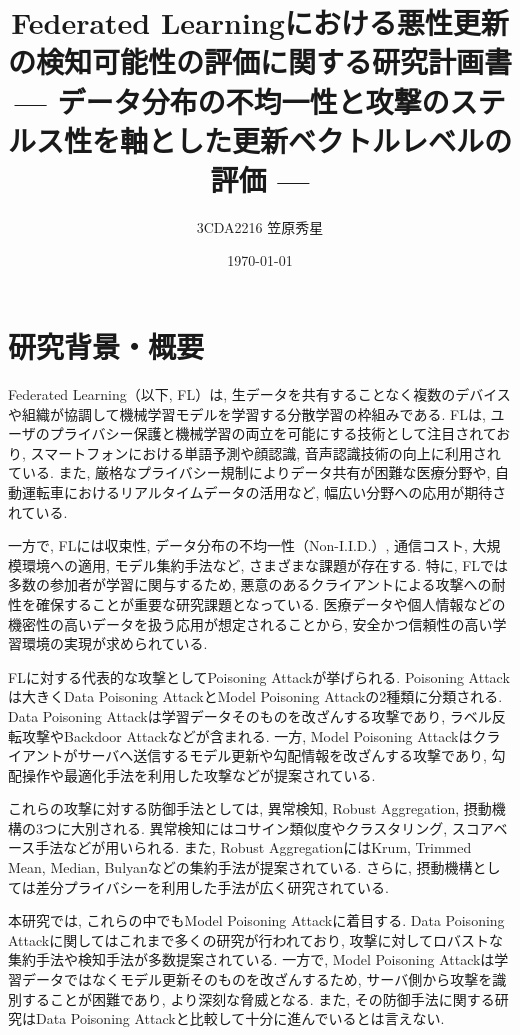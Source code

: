 \documentclass[a4j, twocolumn, dvipdfmx]{jsarticle}
\title{
Federated Learningにおける悪性更新の検知可能性の評価に関する研究計画書\\
\large --- データ分布の不均一性と攻撃のステルス性を軸とした更新ベクトルレベルの評価 ---
}
\author{3CDA2216 笠原秀星}
\date{\today}
\begin{document}
\maketitle

\section{研究背景・概要}

Federated Learning（以下, FL）は, 生データを共有することなく複数のデバイスや組織が協調して機械学習モデルを学習する分散学習の枠組みである\cite{mammen2021fl}.
FLは, ユーザのプライバシー保護と機械学習の両立を可能にする技術として注目されており, スマートフォンにおける単語予測や顔認識, 音声認識技術の向上に利用されている. また, 厳格なプライバシー規制によりデータ共有が困難な医療分野や, 自動運転車におけるリアルタイムデータの活用など, 幅広い分野への応用が期待されている\cite{li2019fl}.

一方で, FLには収束性, データ分布の不均一性（Non-I.I.D.）, 通信コスト, 大規模環境への適用, モデル集約手法など, さまざまな課題が存在する\cite{ma2020privacy}. 特に, FLでは多数の参加者が学習に関与するため, 悪意のあるクライアントによる攻撃への耐性を確保することが重要な研究課題となっている. 医療データや個人情報などの機密性の高いデータを扱う応用が想定されることから, 安全かつ信頼性の高い学習環境の実現が求められている.

FLに対する代表的な攻撃としてPoisoning Attackが挙げられる. Poisoning Attackは大きくData Poisoning AttackとModel Poisoning Attackの2種類に分類される. Data Poisoning Attackは学習データそのものを改ざんする攻撃であり, ラベル反転攻撃やBackdoor Attackなどが含まれる. 一方, Model Poisoning Attackはクライアントがサーバへ送信するモデル更新や勾配情報を改ざんする攻撃であり, 勾配操作や最適化手法を利用した攻撃などが提案されている.

これらの攻撃に対する防御手法としては, 異常検知, Robust Aggregation, 摂動機構の3つに大別される. 異常検知にはコサイン類似度やクラスタリング, スコアベース手法などが用いられる. また, Robust AggregationにはKrum, Trimmed Mean, Median, Bulyanなどの集約手法が提案されている. さらに, 摂動機構としては差分プライバシーを利用した手法が広く研究されている\cite{sagar2023survey}.

本研究では, これらの中でもModel Poisoning Attackに着目する. Data Poisoning Attackに関してはこれまで多くの研究が行われており, 攻撃に対してロバストな集約手法や検知手法が多数提案されている. 一方で, Model Poisoning Attackは学習データではなくモデル更新そのものを改ざんするため, サーバ側から攻撃を識別することが困難であり, より深刻な脅威となる. また, その防御手法に関する研究はData Poisoning Attackと比較して十分に進んでいるとは言えない.
\end{document}
